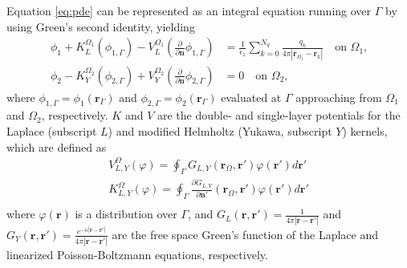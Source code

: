 Equation \eqref{eq:pde} can be represented as an integral equation running over $\Gamma$ by using Green's second identity, yielding
%
\begin{align} \label{eq:volume_potential}
\phi_{1}+ K_{L}^{\Omega_1}(\phi_{1,\Gamma}) -  V_{L}^{\Omega_1} \left(\frac{\partial}{\partial \mathbf{n}}  \phi_{1,\Gamma}  \right) & = \frac{1}{\epsilon_1} \sum_{k=0}^{N_q}  \frac{q_k}{4\pi|\mathbf{r}_{\Omega_1} - \mathbf{r}_k|}  \quad \text{on $\Omega_1$,} \nonumber \\
\phi_{2} - K_{Y}^{\Omega_2}(\phi_{2,\Gamma}) + V_{Y}^{\Omega_2} \left( \frac{\partial}{\partial \mathbf{n}} \phi_{2,\Gamma} \right) & = 0 \quad \text{on $\Omega_2$,}
\end{align}
%
where $\phi_{1,\Gamma} = \phi_1(\mathbf{r}_\Gamma)$ and $\phi_{2,\Gamma} = \phi_2(\mathbf{r}_\Gamma)$ evaluated at $\Gamma$ approaching from $\Omega_1$ and $\Omega_2$, respectively. $K$ and $V$ are the double- and single-layer potentials for the Laplace (subscript $L$) and modified Helmholtz (Yukawa, subscript $Y$) kernels, which are defined as
%
\begin{align}\label{eq:single_double}
V^\Omega_{L,Y}(\varphi) = \oint_\Gamma G_{L,Y}(\mathbf{r}_\Omega,\mathbf{r}')\varphi(\mathbf{r}')d\mathbf{r}'\nonumber\\
K^\Omega_{L,Y}(\varphi) = \oint_\Gamma \frac{\partial G_{L,Y}}{\partial\mathbf{n}'}(\mathbf{r}_\Omega,\mathbf{r}')\varphi(\mathbf{r}')d\mathbf{r}'\nonumber\\
\end{align}
%
where $\varphi(\mathbf{r})$ is a distribution over $\Gamma$, and $G_L(\mathbf{r},\mathbf{r}')=\frac{1}{4\pi|\mathbf{r}-\mathbf{r}'|}$ and $G_Y(\mathbf{r},\mathbf{r}')=\frac{e^{-\kappa|\mathbf{r}-\mathbf{r}'|}}{4\pi|\mathbf{r}-\mathbf{r}'|}$ are the free space Green's function of the Laplace and linearized Poisson-Boltzmann equations, respectively. 

